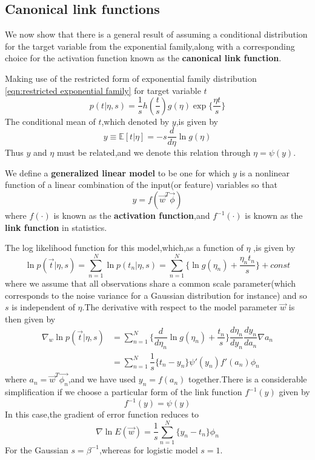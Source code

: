 \subsection{Canonical link functions}
We now show that there is a general result of assuming a conditional distribution for the target variable from the exponential family,along with a corresponding choice for the activation function known as the \textbf{canonical link function}.

Making use of the restricted form of exponential family distribution \ref{eqn:restricted exponential family} for target variable $t$
\begin{equation}
p(t|\eta,s)=\dfrac{1}{s}h(\dfrac{t}{s})g(\eta)\exp\{\dfrac{\eta t}{s}\}
\end{equation}
The conditional mean of $t$,which denoted by $y$,is given by 
\begin{equation}
y \equiv \mathbb{E}[t|\eta]=-s\dfrac{d}{d\eta}\ln g(\eta)
\end{equation}
Thus $y$ and $\eta$ must be related,and we denote this relation through $\eta = \psi(y)$.

We define a \textbf{generalized linear model} to be one for which $y$ is a nonlinear function of a linear combination of the input(or feature) variables so that
\begin{equation}
y=f(\vec{w}^T\vec{\phi})
\end{equation}
where $f(\cdot)$ is known as the \textbf{activation function},and $f^{-1}(\cdot)$ is known as the \textbf{link function} in statistics.

The log likelihood function for this model,which,as a function of $\eta$ ,is given by 
\begin{equation}
\ln p(\vec{t}|\eta,s) = \sum_{n=1}^{N}\ln p(t_n|\eta,s) = \sum_{n=1}^{N}\{\ln g(\eta_n)+\dfrac{\eta_n t_n}{s} \} + const
\end{equation}
where we assume that all observations share a common scale parameter(which corresponds to the noise variance for a Gaussian distribution for instance) and so $s$ is independent of $\eta$.The derivative with respect to the model parameter $\vec{w}$ is then given by 
\begin{align}
\nabla_w\ln p(\vec{t}|\eta,s) 
&=\sum_{n=1}^{N}\{\dfrac{d}{d\eta_n}\ln g(\eta_n)+\dfrac{t_n}{s} \} \dfrac{d\eta_n}{dy_n}\dfrac{dy_n}{da_n}\nabla a_n \\
&= \sum_{n=1}^{N}\dfrac{1}{s}\{t_n-y_n \}\psi'(y_n)f'(a_n)\phi_n
\end{align}
where $a_n=\vec{w}^T\vec{\phi_n}$,and we have used $y_n=f(a_n)$ together.There is a considerable simplification if we choose a particular form of the link function $f^{-1}(y)$ given by
\begin{equation}
f^{-1}(y) = \psi(y)
\end{equation}
In this case,the gradient of error function reduces to 
\begin{equation}
\nabla\ln E(\vec{w}) = \dfrac{1}{s}\sum_{n=1}^{N}\{y_n-t_n\}\phi_n
\end{equation}
For the Gaussian $s=\beta^{-1}$,whereas for logistic model $s=1$.



